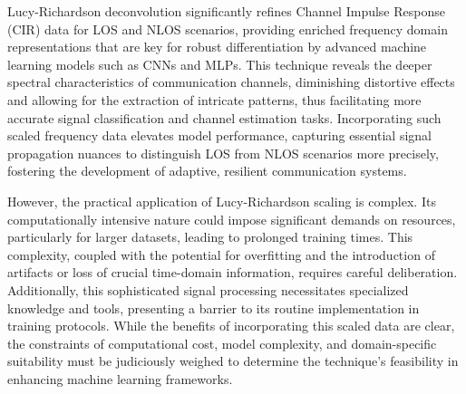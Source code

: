 

Lucy-Richardson deconvolution significantly refines Channel Impulse Response (CIR) data for LOS and NLOS scenarios, providing enriched frequency domain representations that are key for robust differentiation by advanced machine learning models such as CNNs and MLPs. This technique reveals the deeper spectral characteristics of communication channels, diminishing distortive effects and allowing for the extraction of intricate patterns, thus facilitating more accurate signal classification and channel estimation tasks. Incorporating such scaled frequency data elevates model performance, capturing essential signal propagation nuances to distinguish LOS from NLOS scenarios more precisely, fostering the development of adaptive, resilient communication systems.

However, the practical application of Lucy-Richardson scaling is complex. Its computationally intensive nature could impose significant demands on resources, particularly for larger datasets, leading to prolonged training times. This complexity, coupled with the potential for overfitting and the introduction of artifacts or loss of crucial time-domain information, requires careful deliberation. Additionally, this sophisticated signal processing necessitates specialized knowledge and tools, presenting a barrier to its routine implementation in training protocols. While the benefits of incorporating this scaled data are clear, the constraints of computational cost, model complexity, and domain-specific suitability must be judiciously weighed to determine the technique's feasibility in enhancing machine learning frameworks.

